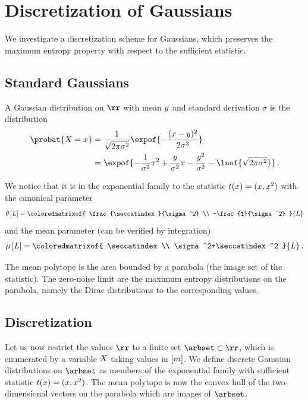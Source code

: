 \section{Discretization of Gaussians}

We investigate a discretization scheme for Gaussians, which preserves the maximum entropy property with respect to the sufficient statistic.

\subsection{Standard Gaussians}

A Gaussian distribution on $\rr$ with mean $y$ and standard derivation $\sigma$ is the distribution
\begin{align*}
    \probat{\indexedcatvariable}
    &= \frac{1}{\sqrt{2\pi\sigma^2}} \expof{-\frac{(\catindex-\seccatindex)^2}{2\sigma^2}} \\
    &= \expof{- \frac{1}{\sigma^2} \catindex^2 + \frac{\seccatindex}{\sigma^2} \catindex - \frac{\seccatindex^2}{\sigma^2} - \lnof{\sqrt{2\pi\sigma^2}}} \, .
\end{align*}

We notice that it is in the exponential family to the statistic $t(x)=(x,x^2)$ with the canonical parameter
\begin{align*}
    \canparamat{\selvariable}
    = \coloredmatrixof{
    \frac{\seccatindex}{\sigma^2} \\
    -\frac{1}{\sigma^2}
    }{\selvariable}
\end{align*}
and the mean parameter (can be verified by integration)
\begin{align*}
    \meanparamat{\selvariable}
    = \coloredmatrixof{
    \seccatindex \\
    \sigma^2+\seccatindex^2
    }{\selvariable} \, .
\end{align*}

The mean polytope is the area bounded by a parabola (the image set of the statistic).
The zero-noise limit are the maximum entropy distributions on the parabola, namely the Dirac distributions to the corresponding values.

\subsection{Discretization}

Let us now restrict the values $\rr$ to a finite set $\arbset\subset\rr$, which is enumerated by a variable $X$ taking values in $[m]$.
We define discrete Gaussian distributions on $\arbset$ as members of the exponential family with sufficient statistic $t(x)=(x,x^2)$.
The mean polytope is now the convex hull of the two-dimensional vectors on the parabola which are images of $\arbset$.


